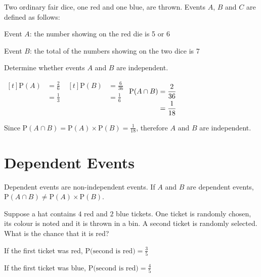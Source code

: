 \documentclass[11pt,a4paper]{book}
\begin{document}
\begin{example}

Two ordinary fair dice, one red and one blue, are thrown. Events $A$,
$B$ and $C$ are defined as follows:

Event $A$: the number showing on the red die is 5 or 6

Event $B$: the total of the numbers showing on the two dice is 7

Determine whether events $A$ and $B$ are independent.

\Solution

$
\begin{aligned}[t]
\text{P}\left(A\right) & =\frac{2}{6}\\
 & =\frac{1}{3}
\end{aligned}
$
\hspace{2cm}
$
\begin{aligned}[t]
\text{P}\left(B\right) & =\frac{6}{36}\\
 & =\frac{1}{6}
\end{aligned}
$
\hspace{2cm}
$
\begin{aligned}[t]
\text{P\ensuremath{\left(A\cap B\right)}} & =\frac{2}{36}\\
 & =\frac{1}{18}
\end{aligned}
$

Since ${\displaystyle \text{P}\left(A\cap B\right)=\text{P}\left(A\right)\times\text{P}\left(B\right)=\frac{1}{18}}$,
therefore $A$ and $B$ are independent.
\end{example}

\section{Dependent Events}

Dependent events are non-independent events. If $A$ and $B$ are dependent events, $\text{P}\left(A\cap B\right)\neq\text{P}\left(A\right)\times\text{P}\left(B\right)$.

Suppose a hat contains $4$ red and $2$ blue tickets. One ticket is randomly chosen, its colour is noted and it is thrown in a bin. A second ticket is randomly selected. What is the chance that it is red?

If the first ticket was red, ${\displaystyle \text{P(second is red)}=\frac{3}{5}}$

If the first ticket was blue, ${\displaystyle \text{P(second is red)}=\frac{4}{5}}$
\end{document}
